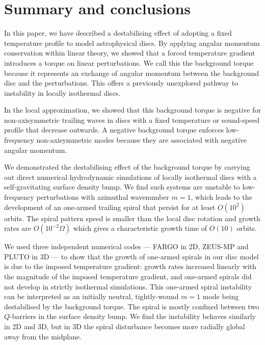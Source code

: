
\section{Summary and conclusions}\label{summary}

  In this paper, we have described a destabilising  
  effect of adopting a fixed temperature profile to model   
  astrophysical discs. By applying angular momentum conservation
  within linear theory, we showed that a forced temperature gradient 
  introduces a torque on linear perturbations. We call this the
  background torque because it represents an exchange of angular
  momentum between the background disc and the perturbations. This 
  offers a previously unexplored pathway to instability in locally
  isothermal discs.  


In the local approximation, we showed that this background torque is
negative for non-axisymmetric trailing waves in discs with a fixed temperature or
sound-speed profile that decrease outwards. A negative background torque enforces  
low-frequency non-axisymmetric modes because they are associated
with negative angular momentum.

 
  We demonstrated the destabilising effect of the background torque by
  carrying out direct numerical hydrodynamic simulations of 
  locally isothermal discs with a self-gravitating surface density
  bump. 
We find such systems are unstable to low-frequency perturbations
with azimuthal wavenumber $m=1$, which leads to the development of an one-armed 
trailing spiral that persist for at least $O(10^2)$ orbits. The spiral
pattern speed is smaller than the local disc rotation and
growth rates are $O(10^{-2}\Omega)$ which gives a characteristic
growth time of $O(10)$ orbits. 

We used three independent numerical codes --- FARGO in 2D, ZEUS-MP and
PLUTO in 3D --- to show that the growth of     
one-armed spirals in our disc model is due to the imposed
temperature gradient: growth rates increased linearly   
with the magnitude of the imposed temperature gradient, and one-armed
spirals did not develop in strictly isothermal simulations. This 
  one-armed spiral instability can be interpreted as an initially 
  neutral, tightly-wound $m=1$ mode being destabilised by the 
  background torque. The spiral
is mostly confined between two $Q$-barriers in the surface density bump. 
We find the instability behaves similarly in 2D and 3D, but in 3D
the spiral disturbance becomes more radially global away from    
the midplane. 


